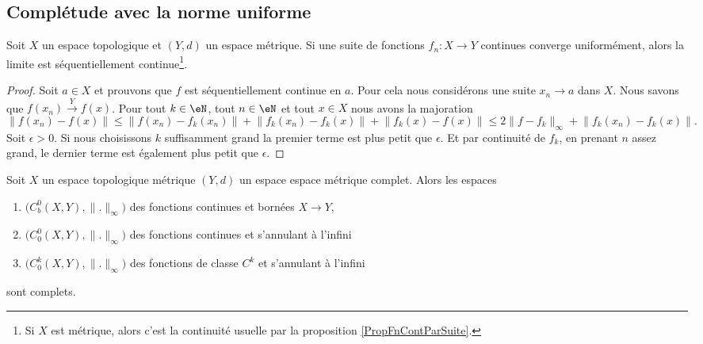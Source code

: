 \subsection{Complétude avec la norme uniforme}

\begin{proposition}\label{PropCZslHBx}
    Soit \( X\) un espace topologique et \( (Y,d)\) un espace métrique. Si une suite de fonctions \( f_n\colon X\to Y\) continues converge uniformément, alors la limite est séquentiellement continue\footnote{Si \( X\) est métrique, alors c'est la continuité usuelle par la proposition \ref{PropFnContParSuite}.}.
\end{proposition}

\begin{proof}
    Soit \( a\in X\) et prouvons que \( f\) est séquentiellement continue en \( a\). Pour cela nous considérons une suite \( x_n\to a\) dans \( X\). Nous savons que \( f(x_n)\stackrel{Y}{\longrightarrow}f(x)\). Pour tout \(k\in \eN\), tout \( n\in \eN\) et tout \( x\in X\) nous avons la majoration
    \begin{equation}
        \big\| f(x_n)-f(x) \big\|\leq \big\| f(x_n)-f_k(x_n) \big\|+\big\| f_k(x_n)-f_k(x) \big\|+\big\| f_k(x)-f(x) \big\|\leq 2\| f-f_k \|_{\infty}+\big\| f_k(x_n)-f_k(x) \big\|.    
    \end{equation}
    Soit \( \epsilon>0\). Si nous choisissons \( k\) suffisamment grand la premier terme est plus petit que \( \epsilon\). Et par continuité de \( f_k\), en prenant \( n\) assez grand, le dernier terme est également plus petit que \( \epsilon\).
\end{proof}

\begin{proposition} \label{PropSYMEZGU}
    Soit \( X\) un espace topologique métrique \( (Y,d)\) un espace espace métrique complet. Alors les espaces
    \begin{enumerate}
        \item
            \( \big( C^0_b(X,Y),\| . \|_{\infty} \big)\) des fonctions continues et bornées \( X\to Y\),
        \item
            \( \big( C^0_0(X,Y),\| . \|_{\infty} \big)\) des fonctions continues et s'annulant à l'infini
        \item
            \( \big( C^k_0(X,Y),\| . \|_{\infty} \big)\) des fonctions de classe \( C^k\) et s'annulant à l'infini
    \end{enumerate} 
    sont complets.
\end{proposition}

